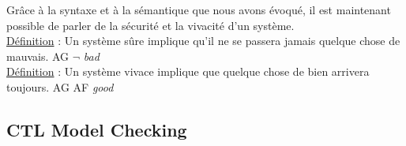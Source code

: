 \documentclass[runningheads,a4paper]{llncs}
\begin{document}
\noindent Grâce à la syntaxe et à la sémantique que nous avons évoqué, il est maintenant possible de parler de la sécurité et la vivacité d'un système.\\

\noindent \underline{Définition} : Un système sûre implique qu'il ne se passera jamais quelque chose de mauvais. AG $\lnot$ \textit{bad} \\
\underline{Définition} : Un système vivace implique que quelque chose de bien arrivera toujours. AG AF \textit{good}



\subsection{CTL Model Checking}
\end{document}
